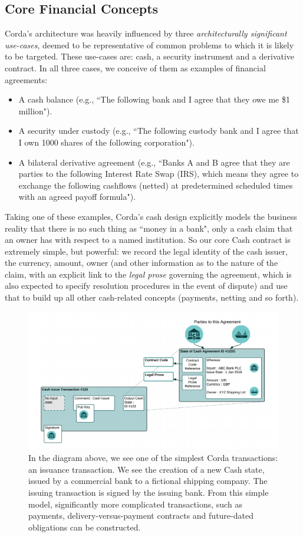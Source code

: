 \documentclass{article}
\begin{document}
\subsection{Core Financial Concepts}
Corda's architecture was heavily influenced by three \textit{architecturally significant use-cases}, deemed to be  representative of common problems to which it is likely to be targeted.  These use-cases are: cash, a security instrument and a derivative contract. In all three cases, we conceive of them as examples of financial agreements:
\begin{itemize}
\item A cash balance (e.g., ``The following bank and I agree that they owe me \$1 million").
\item A security under custody (e.g., ``The following custody bank and I agree that I own 1000 shares of the following corporation").
\item A bilateral derivative agreement (e.g., ``Banks A and B agree that they are parties to the following Interest Rate Swap (IRS), which means they agree to exchange the following cashflows (netted) at predetermined scheduled times with an agreed payoff formula").
\end{itemize}
Taking one of these examples, Corda's cash design explicitly models the business reality that there is no such thing as ``money in a bank", only a cash claim that an owner has with respect to a named institution.\cite{BOE} So our core Cash contract is extremely simple, but powerful: we record the legal identity of the cash issuer, the currency, amount, owner (and other information as to the nature of the claim, with an explicit link to the \textit{legal prose} governing the agreement, which is also expected to specify resolution procedures in the event of dispute) and use that to build up all other cash-related concepts (payments, netting and so forth).
\begin{figure}[H]
\includegraphics[scale = .4, center]{cash}
\caption{In the diagram above, we see one of the simplest Corda transactions: an issuance transaction.  We see the creation of a new Cash state, issued by a commercial bank to a fictional shipping company. The issuing transaction is signed by the issuing bank.  From this simple model, significantly more complicated transactions, such as payments, delivery-versus-payment contracts and future-dated obligations can be constructed.}
\end{figure}
\end{document}
